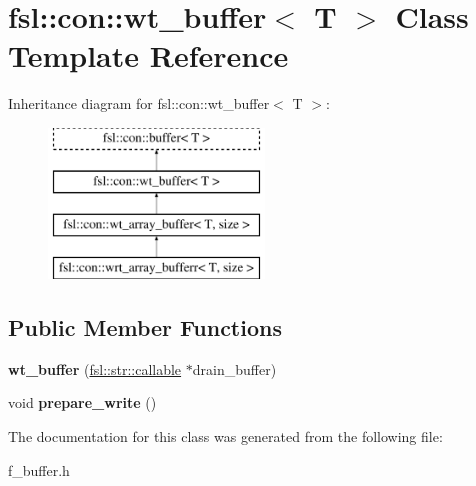 \hypertarget{classfsl_1_1con_1_1wt__buffer}{}\section{fsl\+::con\+::wt\+\_\+buffer$<$ T $>$ Class Template Reference}
\label{classfsl_1_1con_1_1wt__buffer}
Inheritance diagram for fsl\+::con\+::wt\+\_\+buffer$<$ T $>$\+:\begin{figure}[H]
\begin{center}
\leavevmode
\includegraphics[height=4.000000cm]{classfsl_1_1con_1_1wt__buffer}
\end{center}
\end{figure}
\subsection*{Public Member Functions}
\begin{DoxyCompactItemize}
\item 
\mbox{\label{classfsl_1_1con_1_1wt__buffer_aaf00930328b3eb63535e79f0b442ca78}} 
{\bfseries wt\+\_\+buffer} (\mbox{\hyperlink{classfsl_1_1str_1_1callable}{fsl\+::str\+::callable}} $\ast$drain\+\_\+buffer)
\item 
\mbox{\label{classfsl_1_1con_1_1wt__buffer_aa665f2f666ed8c3cdb297f855d73196c}} 
void {\bfseries prepare\+\_\+write} ()
\end{DoxyCompactItemize}


The documentation for this class was generated from the following file\+:\begin{DoxyCompactItemize}
\item 
f\+\_\+buffer.\+h\end{DoxyCompactItemize}

